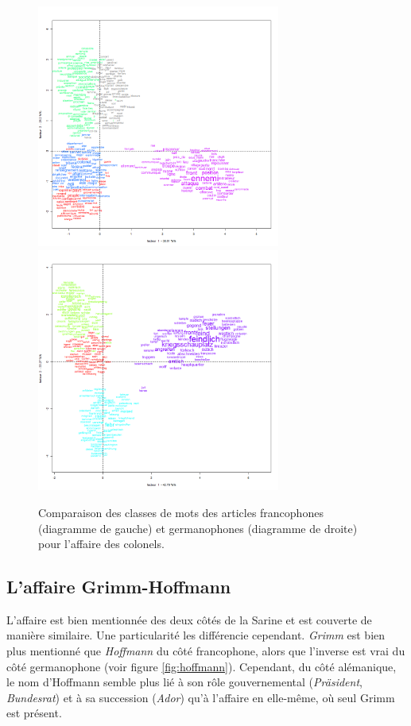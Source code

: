 \documentclass[french,a4paper]{article}
\begin{document}
\begin{figure}[h!]
    \includegraphics[width=8cm]{imgs/FR/affaire_colonel_10classes.png}
    \includegraphics[width=8cm]{imgs/DE/Oberst10classes.png}
    \caption{Comparaison des classes de mots des articles francophones (diagramme de gauche) et germanophones (diagramme de droite) pour l'affaire des colonels.}
    \centering
    \label{fig:colonel}
\end{figure}


\subsection*{L'affaire Grimm-Hoffmann}

L'affaire est bien mentionnée des deux côtés de la Sarine et est couverte de manière similaire.
Une particularité les différencie cependant.
\textit{Grimm} est bien plus mentionné que \textit{Hoffmann} du côté francophone, alors que l'inverse est vrai du côté germanophone (voir figure \ref{fig:hoffmann}).
Cependant, du côté alémanique, le nom d'Hoffmann semble plus lié à son rôle gouvernemental (\textit{Präsident}, \textit{Bundesrat}) et à sa succession (\textit{Ador}) qu'à l'affaire en elle-même, où seul Grimm est présent.
\end{document}
